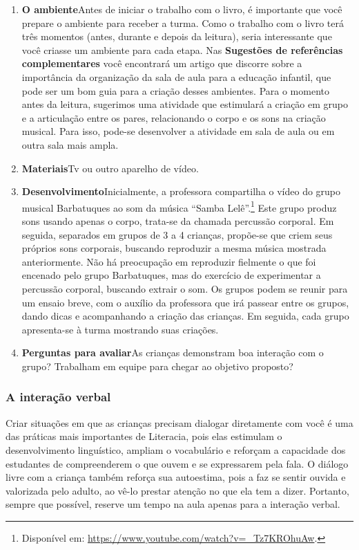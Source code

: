\documentclass[11pt]{extarticle}
\begin{document}
\begin{enumerate}
\item \textbf{O ambiente}\quad Antes de iniciar o trabalho com o livro, é importante que você 
prepare o ambiente para receber a turma. Como o trabalho com o livro terá 
três momentos (antes, durante e depois da leitura), seria interessante que você 
criasse um ambiente para cada etapa. Nas \textbf{Sugestões de referências complementares} 
você encontrará um artigo que discorre sobre a importância da organização da sala 
de aula para a educação infantil, que pode ser um bom guia para a criação desses 
ambientes.
Para o momento antes da leitura, sugerimos uma atividade que estimulará a criação em grupo e a articulação entre os pares, relacionando o corpo e os sons na criação musical.
Para isso, pode-se desenvolver a atividade em sala de aula ou em outra sala mais ampla.

\item \textbf{Materiais}\quad Tv ou outro aparelho de vídeo. 

\item \textbf{Desenvolvimento}\quad Inicialmente, a professora compartilha o vídeo do grupo musical Barbatuques ao som da música ``Samba Lelê''.\footnote{Disponível em: \url{https://www.youtube.com/watch?v=_Tz7KROhuAw}.} Este grupo produz sons usando apenas o corpo, trata-se da chamada percussão corporal. Em seguida, separados em grupos de 3 a 4 crianças, propõe-se que criem seus próprios sons corporais, buscando reproduzir a mesma música mostrada anteriormente. Não há preocupação em reproduzir fielmente o que foi encenado pelo grupo Barbatuques, mas do exercício de experimentar a percussão corporal, buscando extrair o som. Os grupos podem se reunir para um ensaio breve, com o auxílio da professora que irá passear entre os grupos, dando dicas e acompanhando a criação das crianças. Em seguida, cada grupo apresenta-se à turma mostrando suas criações.  


\item \textbf{Perguntas para avaliar}\quad As crianças demonstram boa interação com o grupo? Trabalham em equipe para chegar ao objetivo proposto?

\end{enumerate}


\subsubsection{A interação verbal} 
Criar situações em que as crianças precisam dialogar diretamente com 
você é uma das práticas mais importantes de Literacia, pois elas estimulam 
o desenvolvimento linguístico, ampliam o vocabulário e reforçam a 
capacidade dos estudantes de compreenderem o que ouvem e se expressarem 
pela fala. O diálogo livre com a criança também reforça sua autoestima, pois 
a faz se sentir ouvida e valorizada pelo adulto, ao vê-lo prestar atenção 
no que ela tem a dizer. Portanto, sempre que possível, reserve um tempo na 
aula apenas para a interação verbal. 
\end{document}
